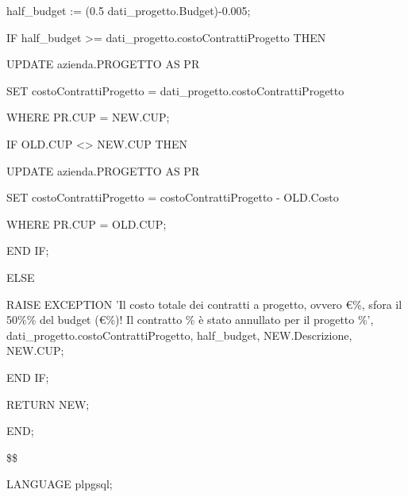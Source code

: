 \begin{flushleft}
\begin{description}
\begin{description}
                    \vspace{0.5cm}

                    \item half\_budget := (0.5 \* dati\_progetto.Budget)-0.005;
                
                    \vspace{0.5cm}

                    \item IF half\_budget >= dati\_progetto.costoContrattiProgetto THEN
                    \begin{description}
                        \item UPDATE azienda.PROGETTO AS PR
                        \item SET costoContrattiProgetto = dati\_progetto.costoContrattiProgetto
                        \item WHERE PR.CUP = NEW.CUP;

                        \vspace{0.5cm}

                        \item IF OLD.CUP <> NEW.CUP THEN
                        \begin{description}
                            \item UPDATE azienda.PROGETTO AS PR
                            \item SET costoContrattiProgetto = costoContrattiProgetto - OLD.Costo
                            \item WHERE PR.CUP = OLD.CUP;
                        \end{description}
                        \item END IF;
                    \end{description}
                    \item ELSE
                    \begin{description}
                        \item RAISE EXCEPTION 'Il costo totale dei contratti a progetto, ovvero €\%, sfora il 50\%\% del budget (€\%)! Il contratto \% è stato annullato per il progetto \%', dati\_progetto.costoContrattiProgetto, half\_budget, NEW.Descrizione, NEW.CUP;
                    \end{description}
                    \item END IF;
                
                    \item RETURN NEW;

                \end{description}

                \item END;
                \item \$\$
                \item LANGUAGE plpgsql;
            \end{description}
        \end{flushleft}
    \normalfont

